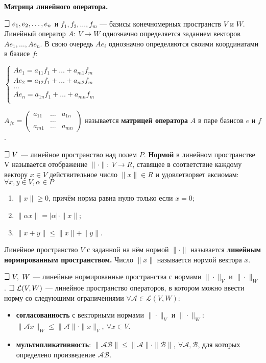 \textbf{Матрица линейного оператора.}

$\mathLet ~ e_1, e_2,\dots,e_n$ и $f_1, f_2,\dots,f_m$ --- базисы конечномерных пространств $V$ и $W$. Линейный оператор $A:~V \to W$ однозначно определяется заданием векторов $Ae_1,\dots, Ae_n$. В свою очередь $Ae_i$ однозначно определяются своими координатами в базисе $f$:

$\begin{cases}
     Ae_1 = a_{11}f_1 + \dots + a_{m1}f_m&\\
     Ae_2 = a_{12}f_1 + \dots + a_{m2}f_m&\\
     \dots&\\
     Ae_n = a_{1n}f_1 + \dots + a_{mn}f_m&\\
\end{cases}$

$A_{fe} = \begin{pmatrix}a_{11} & \dots & a_{1n} \\ & \dots & \\ a_{m1} & \dots & a_{mn} \end{pmatrix}$ называется \textbf{матрицей оператора} $A$ в паре базисов $e$ и $f$.

$\mathLet ~ V$ --- линейное пространство над полем $P$.
\textbf{Нормой} в линейном пространстве V называется отображение $\|\cdot\|:~V \to R$, ставящее в соответствие каждому вектору $x \in V$ действительное число $\|x\| \in R$ и удовлетворяет аксиомам: $\forall x, y \in V, \alpha \in P$
\begin{enumerate}
    \item $\|x\| \geqslant 0$, причём норма равна нулю только если $x = 0$;
    \item $\|\alpha x\| = |\alpha| \cdot \|x\|$;
    \item $\|x + y\| \leqslant \|x\| + \|y\|$.
\end{enumerate}

Линейное пространство $V$ с заданной на нём нормой $\| \cdot \|$ называется \textbf{линейным нормированным пространством.} Число $\|x\|$ называется нормой вектора $x$.

$\mathLet ~ V, ~W$ --- линейные нормированные пространства с нормами $\| \cdot \|_V$ и $\| \cdot \|_W$. 
$\mathLet ~ \mathcal{L}(V, W)$ --- линейное пространство операторов, в котором можно ввести норму со следующими ограничениями $\forall \mathcal{A} \in \mathcal{L}(V, W)$:
\begin{itemize}
    \item \textbf{согласованность} с векторными нормами  $\| \cdot \|_V$ и $\| \cdot \|_W$: $\| \mathcal{A}x \|_W \leqslant \| \mathcal{A} \| \cdot \| x \|_V,~\forall x \in V$.
    \item \textbf{мультипликативность}: $\|\mathcal{A}\mathcal{B}\| \leqslant \| \mathcal{A}\|\cdot\|\mathcal{B}\|,~\forall\mathcal{A},\mathcal{B}$, для которых определено произведение $\mathcal{A}\mathcal{B}$.
\end{itemize}

